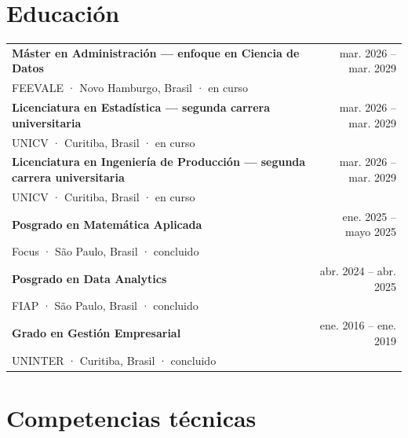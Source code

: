 \documentclass[10pt,a4paper]{article}
\begin{document}
\section{Educación}

\begin{tabularx}{\textwidth}{@{}Xr@{}}
\textbf{Máster en Administración — enfoque en Ciencia de Datos} & mar. 2026 – mar. 2029\\
FEEVALE · Novo Hamburgo, Brasil · en curso &\\[3pt]
\textbf{Licenciatura en Estadística — segunda carrera universitaria} & mar. 2026 – mar. 2029\\
UNICV · Curitiba, Brasil · en curso &\\[3pt]
\textbf{Licenciatura en Ingeniería de Producción — segunda carrera universitaria} & mar. 2026 – mar. 2029\\
UNICV · Curitiba, Brasil · en curso &\\[3pt]
\textbf{Posgrado en Matemática Aplicada} & ene. 2025 – mayo 2025\\
Focus · São Paulo, Brasil · concluido &\\[3pt]
\textbf{Posgrado en Data Analytics} & abr. 2024 – abr. 2025\\
FIAP · São Paulo, Brasil · concluido &\\[3pt]
\textbf{Grado en Gestión Empresarial} & ene. 2016 – ene. 2019\\
UNINTER · Curitiba, Brasil · concluido &
\end{tabularx}

\section{Competencias técnicas}
\end{document}
